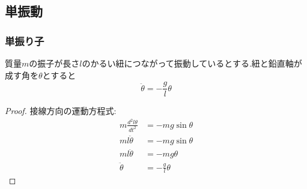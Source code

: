\documentclass[dvipdfmx,uplatex]{jsarticle}
\begin{document}
\subsection{単振動}

\subsubsection{単振り子}
\begin{theo}
質量$m$の振子が長さ$l$のかるい紐につながって振動しているとする.紐と鉛直軸が成す角を$\theta$とすると
\[
\ddot{\theta} = - \frac{g}{l} \theta
\]
\end{theo}


\begin{proof}
接線方向の運動方程式:
\begin{align*}
m \frac{d^2l\theta}{dt^2} &= -mg\sin \theta \\
ml\ddot{\theta} &= -mg\sin \theta \\
ml\ddot{\theta} &= -mg \theta \\
\ddot{\theta} &= - \frac{g}{l} \theta
\end{align*}
\end{proof}
\end{document}
